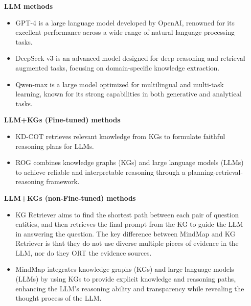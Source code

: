 \textbf{LLM methods}  
\begin{itemize}
    \item GPT-4 is a large language model developed by OpenAI, renowned for its excellent performance across a wide range of natural language processing tasks.  
    \item DeepSeek-v3 \cite{DeepSeekAI2024DeepSeekV3TR} is an advanced model designed for deep reasoning and retrieval-augmented tasks, focusing on domain-specific knowledge extraction.  
    \item Qwen-max is a large model optimized for multilingual and multi-task learning, known for its strong capabilities in both generative and analytical tasks.
\end{itemize}

\textbf{LLM+KGs (Fine-tuned) methods}  
\begin{itemize}
    \item KD-COT \cite{Wang2023KnowledgeDrivenCE} retrieves relevant knowledge from KGs to formulate faithful reasoning plans for LLMs.  
    \item ROG \cite{Luo2023ReasoningOG} combines knowledge graphs (KGs) and large language models (LLMs) to achieve reliable and interpretable reasoning through a planning-retrieval-reasoning framework.
\end{itemize}

\textbf{LLM+KGs (non-Fine-tuned) methods}  
\begin{itemize}
    \item KG Retriever aims to find the shortest path between each pair of question entities, and then retrieves the final prompt from the KG to guide the LLM in answering the question. The key difference between MindMap and KG Retriever is that they do not use diverse multiple pieces of evidence in the LLM, nor do they ORT the evidence sources.  
    \item MindMap \cite{wen-etal-2024-mindmap} integrates knowledge graphs (KGs) and large language models (LLMs) by using KGs to provide explicit knowledge and reasoning paths, enhancing the LLM's reasoning ability and transparency while revealing the thought process of the LLM.
\end{itemize}

